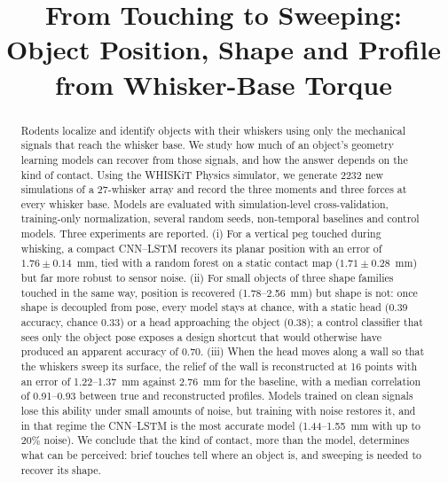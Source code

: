 \documentclass[conference]{IEEEtran}
\newcommand{\pmsd}[2]{$#1 \pm #2$}
\begin{document}
\title{From Touching to Sweeping: Object Position, Shape and Profile from Whisker-Base Torque}

\author{
\and
{}
}

\maketitle

\begin{abstract}
Rodents localize and identify objects with their whiskers using only the mechanical signals that reach the whisker base. We study how much of an object's geometry learning models can recover from those signals, and how the answer depends on the kind of contact. Using the WHISKiT Physics simulator, we generate 2232 new simulations of a 27-whisker array and record the three moments and three forces at every whisker base. Models are evaluated with simulation-level cross-validation, training-only normalization, several random seeds, non-temporal baselines and control models. Three experiments are reported. (i) For a vertical peg touched during whisking, a compact CNN--LSTM recovers its planar position with an error of \pmsd{1.76}{0.14}~mm, tied with a random forest on a static contact map (\pmsd{1.71}{0.28}~mm) but far more robust to sensor noise. (ii) For small objects of three shape families touched in the same way, position is recovered (1.78--2.56~mm) but shape is not: once shape is decoupled from pose, every model stays at chance, with a static head (0.39 accuracy, chance 0.33) or a head approaching the object (0.38); a control classifier that sees only the object pose exposes a design shortcut that would otherwise have produced an apparent accuracy of 0.70. (iii) When the head moves along a wall so that the whiskers sweep its surface, the relief of the wall is reconstructed at 16 points with an error of 1.22--1.37~mm against 2.76~mm for the baseline, with a median correlation of 0.91--0.93 between true and reconstructed profiles. Models trained on clean signals lose this ability under small amounts of noise, but training with noise restores it, and in that regime the CNN--LSTM is the most accurate model (1.44--1.55~mm with up to 20\% noise). We conclude that the kind of contact, more than the model, determines what can be perceived: brief touches tell where an object is, and sweeping is needed to recover its shape.
\end{abstract}
\end{document}

